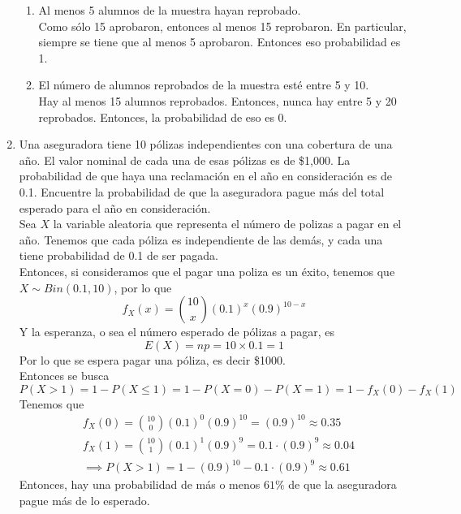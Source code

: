\documentclass[11pt,a4paper]{report}
\begin{document}
\begin{enumerate}
{\begin{enumerate}
                \item {
                	Al menos 5 alumnos de la muestra hayan reprobado.\\
					Como sólo 15 aprobaron, entonces al menos 15 reprobaron.
					En particular, siempre se tiene que al menos 5 aprobaron.
					Entonces eso probabilidad es 1.
                }

                \item {
                	El número de alumnos reprobados de la muestra esté entre 5 y 10.\\
					Hay al menos 15 alumnos reprobados. Entonces, nunca hay entre
					5 y 20 reprobados. Entonces, la probabilidad de eso es 0.
                }
            \end{enumerate}
		}

		\item{
            Una aseguradora tiene 10 pólizas independientes con una cobertura
            de una año. El valor nominal de cada una de esas pólizas es de
            \$1,000. La probabilidad de que haya una reclamación en el año en
            consideración es de 0.1. Encuentre la probabilidad de que la
            aseguradora pague más del total esperado para el año en
            consideración.\\
			Sea $X$ la variable aleatoria que representa el número de polizas
			a pagar en el año. Tenemos que cada póliza es independiente de las
			demás, y cada una tiene probabilidad de 0.1 de ser pagada.\\
			Entonces, si consideramos que el pagar una poliza es un éxito,
			tenemos que $X \sim  Bin(0.1, 10)$, por lo que
			\[f_X(x) = {10 \choose x}(0.1)^x (0.9)^{10-x}\]
			Y la esperanza, o sea el número esperado de pólizas a pagar, es
			\[E(X) = np = 10 \times 0.1 = 1\]
			Por lo que se espera pagar una póliza, es decir \$1000.\\
			Entonces se busca
			\[P(X > 1) = 1 - P(X \leq 1) = 1 - P(X = 0) - P(X = 1) = 1 - f_X(0) - f_X(1)\]
			Tenemos que
			\begin{align*}
				&f_X(0) = {10 \choose 0}(0.1)^0 (0.9)^{10} = (0.9)^{10} \approx 0.35 \\
				&f_X(1) = {10 \choose 1}(0.1)^1 (0.9)^9 = 0.1 \cdot (0.9)^9 \approx 0.04\\
				&\implies P(X > 1) = 1 - (0.9)^{10} - 0.1 \cdot (0.9)^9 \approx 0.61
			\end{align*}
			Entonces, hay una probabilidad de más o menos $61\%$ de que la
			aseguradora pague más de lo esperado.
		}


\end{enumerate}
\end{document}
